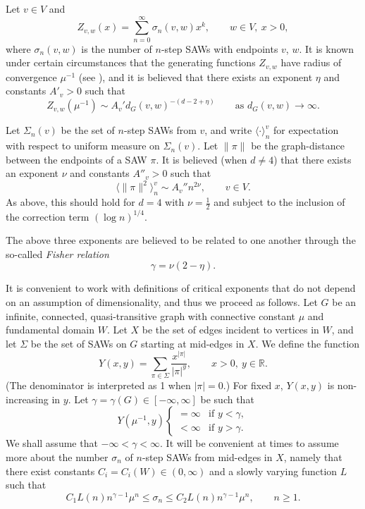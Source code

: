 \documentclass[12pt]{amsart}
\theoremstyle{plain}
\numberwithin{equation}{section}
\numberwithin{theorem}{section}
\numberwithin{figure}{section}
\newcommand\s{\sigma}
\newcommand\oo{\infty}
\newcommand\RR{{\mathbb R}}
\newcommand\Si{\Sigma}
\newcommand\g{\gamma}
\begin{document}
Let $v \in V$ and
\begin{equation}
Z_{v,w}(x)=\sum_{n=0}^\oo \s_n(v,w)x^k, \qquad w \in V,\ x>0,
\label{defz}
\end{equation} 
where $\s_n(v,w)$ is the number of $n$-step SAWs with endpoints
$v$, $w$.
It is known under certain circumstances that the generating 
functions $Z_{v,w}$ have radius of convergence $\mu^{-1}$ 
(see \cite[Cor.\ 3.2.6]{ms}),
and it is believed that there exists an exponent $\eta$ and constants 
$A'_v>0$  such that
\begin{equation}\label{defeta}
Z_{v,w}(\mu^{-1})\sim A_v'{d_G(v,w)}^{-(d-2+\eta)}
\qquad \text{as } d_G(v,w)\to\oo.
\end{equation}

Let $\Si_n(v)$ be the set of $n$-step SAWs from $v$,
and write $\langle \cdot \rangle_n^v$ for expectation with respect to
uniform measure on $\Sigma_n(v)$. Let
$\|\pi\|$ be the graph-distance between the endpoints of 
a SAW $\pi$.
It is believed (when $d\ne 4$) that
there exists an exponent $\nu$ and constants
$A''_v>0$ such that  
\begin{equation}\label{defnu}
\langle \|\pi\|^2\rangle_n^v \sim A_v'' n^{2\nu}, \qquad v \in V.
\end{equation}
As above, this should hold for $d=4$ with $\nu=\frac12$ and subject to the
inclusion of the correction term $(\log n)^{1/4}$.

The above three exponents  are believed to be related to one another 
through the so-called \emph{Fisher relation}
\begin{equation}\label{fisher-rel}
\gamma = \nu(2-\eta).
\end{equation}

It is convenient to work with 
definitions of critical exponents that do not depend on
an assumption of dimensionality, and thus we proceed as follows.
Let $G$ be an infinite, connected, quasi-transitive graph with 
connective constant $\mu$ and fundamental domain $W$.
Let $X$ be the set of edges incident to vertices in  $W$,
and let $\Sigma$ be the set of SAWs on $G$ starting at mid-edges in $X$.
We define the function
\begin{equation*}\label{expatn}
Y(x,y)=
\sum_{\pi\in\Sigma}
\frac{x^{|\pi|}}{|\pi|^y}, \qquad x> 0,\ y\in\RR.
\end{equation*}
(The denominator is interpreted as 1 when $|\pi|=0$.)
For fixed $x$, $Y(x,y)$ is non-increasing in $y$. 
Let $\g=\g(G)\in[-\oo,\oo]$ be such that
$$
Y(\mu^{-1},y) \begin{cases} =\infty &\text{if } y<\gamma,\\ 
<\oo &\text{if } y>\g.
\end{cases}
$$
We shall assume that $-\oo < \g<\oo$. 
It will be convenient at times to  assume more about
the number $\s_n$ of $n$-step SAWs from mid-edges in $X$, 
namely that   there exist constants $C_i=C_i(W) \in(0,\infty)$ and a slowly varying function $L$ 
such that
\begin{equation}\label{def:slow}
C_1 L(n)n^{\gamma-1}\mu^n\leq \sigma_{n}\leq C_2 L(n)n^{\gamma-1}\mu^n, \qquad n \ge 1.
\end{equation}
\end{document}
